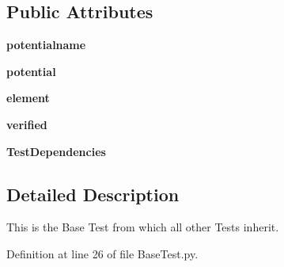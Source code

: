 \subsection*{Public Attributes}
\begin{DoxyCompactItemize}
\item 
\hypertarget{classopenkimtest_1_1tests_1_1BaseTest_1_1BaseTest_a422bfa7570b34595c00bc9283f7cc811}{
{\bfseries potentialname}}
\label{classopenkimtest_1_1tests_1_1BaseTest_1_1BaseTest_a422bfa7570b34595c00bc9283f7cc811}

\item 
\hypertarget{classopenkimtest_1_1tests_1_1BaseTest_1_1BaseTest_a071eb61fe965543eaf59541cc2f2bd19}{
{\bfseries potential}}
\label{classopenkimtest_1_1tests_1_1BaseTest_1_1BaseTest_a071eb61fe965543eaf59541cc2f2bd19}

\item 
\hypertarget{classopenkimtest_1_1tests_1_1BaseTest_1_1BaseTest_a40a4731cd08913a1eeb2b7eb614d22c0}{
{\bfseries element}}
\label{classopenkimtest_1_1tests_1_1BaseTest_1_1BaseTest_a40a4731cd08913a1eeb2b7eb614d22c0}

\item 
\hypertarget{classopenkimtest_1_1tests_1_1BaseTest_1_1BaseTest_a4d5577c58779a0ba8ac065a3769a9302}{
{\bfseries verified}}
\label{classopenkimtest_1_1tests_1_1BaseTest_1_1BaseTest_a4d5577c58779a0ba8ac065a3769a9302}

\item 
\hypertarget{classopenkimtest_1_1tests_1_1BaseTest_1_1BaseTest_a7f79bb48eb03eafa2e55021e634ac37a}{
{\bfseries TestDependencies}}
\label{classopenkimtest_1_1tests_1_1BaseTest_1_1BaseTest_a7f79bb48eb03eafa2e55021e634ac37a}

\end{DoxyCompactItemize}


\subsection{Detailed Description}
\begin{DoxyVerb}This is the Base Test from which all other Tests inherit.\end{DoxyVerb}
 

Definition at line 26 of file BaseTest.py.



